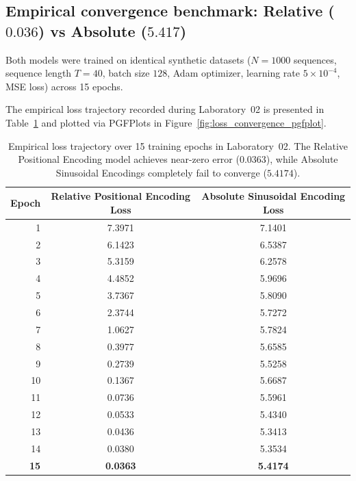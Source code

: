 \documentclass[../labs.tex]{subfiles}
\begin{document}
\subsection{Empirical convergence benchmark: Relative ($0.036$) vs Absolute ($5.417$)}

Both models were trained on identical synthetic datasets ($N = 1000$ sequences, sequence length $T = 40$, batch size $128$, Adam optimizer, learning rate $5 \times 10^{-4}$, MSE loss) across 15 epochs. 

The empirical loss trajectory recorded during Laboratory~02 is presented in Table~\ref{tab:relative_vs_absolute_loss} and plotted via PGFPlots in Figure~\ref{fig:loss_convergence_pgfplot}.

\begin{table}[htbp]
\centering
\small
\renewcommand{\arraystretch}{1.2}
\begin{tabular}{r c c}
\toprule
\textbf{Epoch} & \textbf{Relative Positional Encoding Loss} & \textbf{Absolute Sinusoidal Encoding Loss} \\
\midrule
1  & 7.3971 & 7.1401 \\
2  & 6.1423 & 6.5387 \\
3  & 5.3159 & 6.2578 \\
4  & 4.4852 & 5.9696 \\
5  & 3.7367 & 5.8090 \\
6  & 2.3744 & 5.7272 \\
7  & 1.0627 & 5.7824 \\
8  & 0.3977 & 5.6585 \\
9  & 0.2739 & 5.5258 \\
10 & 0.1367 & 5.6687 \\
11 & 0.0736 & 5.5961 \\
12 & 0.0533 & 5.4340 \\
13 & 0.0436 & 5.3413 \\
14 & 0.0380 & 5.3534 \\
\textbf{15} & \textbf{0.0363} & \textbf{5.4174} \\
\bottomrule
\end{tabular}
\caption{Empirical loss trajectory over 15 training epochs in Laboratory~02. The Relative Positional Encoding model achieves near-zero error ($0.0363$), while Absolute Sinusoidal Encodings completely fail to converge ($5.4174$).}
\label{tab:relative_vs_absolute_loss}
\end{table}
\end{document}

